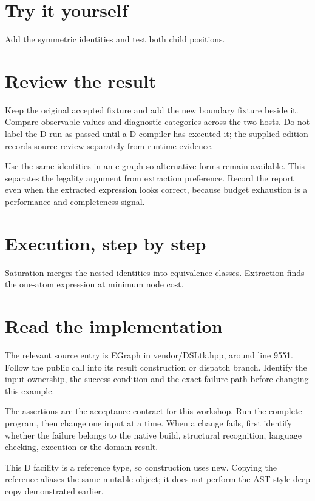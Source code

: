 \section*{Try it yourself}
Add the symmetric identities and test both child positions.

\section*{Review the result}
Keep the original accepted fixture and add the new boundary fixture beside it. Compare observable values and diagnostic categories across the two hosts. Do not label the D run as passed until a D compiler has executed it; the supplied edition records source review separately from runtime evidence.

\clearpage
{}
Use the same identities in an e-graph so alternative forms remain available. This separates the legality argument from extraction preference. Record the report even when the extracted expression looks correct, because budget exhaustion is a performance and completeness signal.


\section*{Execution, step by step}
Saturation merges the nested identities into equivalence classes. Extraction finds the one-atom expression at minimum node cost.

\section*{Read the implementation}
The relevant source entry is EGraph in vendor/DSLtk.hpp, around line 9551. Follow the public call into its result construction or dispatch branch. Identify the input ownership, the success condition and the exact failure path before changing this example.

The assertions are the acceptance contract for this workshop. Run the complete program, then change one input at a time. When a change fails, first identify whether the failure belongs to the native build, structural recognition, language checking, execution or the domain result.

\clearpage
{}
This D facility is a reference type, so construction uses new. Copying the reference aliases the same mutable object; it does not perform the AST-style deep copy demonstrated earlier.

